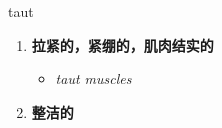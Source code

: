 
\begin{frame}
{\huge taut}
\begin{center}
\begin{enumerate}\Large
  \item \textbf{拉紧的，紧绷的，肌肉结实的}
  \begin{itemize}
    \item \em{\Large{taut muscles}}
  \end{itemize}
  \item \textbf{整洁的}
\end{enumerate}
\end{center}
\end{frame}
